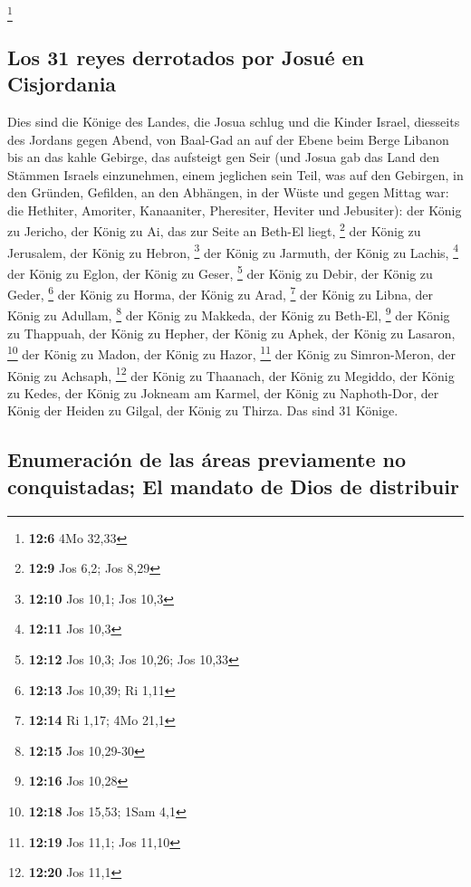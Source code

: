 \footnote{\textbf{12:6} 4Mo 32,33}

\hypertarget{los-31-reyes-derrotados-por-josuuxe9-en-cisjordania}{%
\subsection{Los 31 reyes derrotados por Josué en
Cisjordania}\label{los-31-reyes-derrotados-por-josuuxe9-en-cisjordania}}

 Dies sind die Könige des Landes, die Josua schlug und die
Kinder Israel, diesseits des Jordans gegen Abend, von Baal-Gad an auf
der Ebene beim Berge Libanon bis an das kahle Gebirge, das aufsteigt gen
Seir (und Josua gab das Land den Stämmen Israels einzunehmen, einem
jeglichen sein Teil,  was auf den Gebirgen, in den
Gründen, Gefilden, an den Abhängen, in der Wüste und gegen Mittag war:
die Hethiter, Amoriter, Kanaaniter, Pheresiter, Heviter und Jebusiter):
 der König zu Jericho, der König zu Ai, das zur Seite an
Beth-El liegt, \footnote{\textbf{12:9} Jos 6,2; Jos 8,29}
 der König zu Jerusalem, der König zu Hebron, \footnote{\textbf{12:10}
  Jos 10,1; Jos 10,3}  der König zu Jarmuth, der König zu
Lachis, \footnote{\textbf{12:11} Jos 10,3}  der König zu
Eglon, der König zu Geser, \footnote{\textbf{12:12} Jos 10,3; Jos 10,26;
  Jos 10,33}  der König zu Debir, der König zu Geder,
\footnote{\textbf{12:13} Jos 10,39; Ri 1,11}  der König
zu Horma, der König zu Arad, \footnote{\textbf{12:14} Ri 1,17; 4Mo 21,1}
 der König zu Libna, der König zu Adullam, \footnote{\textbf{12:15}
  Jos 10,29-30}  der König zu Makkeda, der König zu
Beth-El, \footnote{\textbf{12:16} Jos 10,28}  der König
zu Thappuah, der König zu Hepher,  der König zu Aphek,
der König zu Lasaron, \footnote{\textbf{12:18} Jos 15,53; 1Sam 4,1}
 der König zu Madon, der König zu Hazor, \footnote{\textbf{12:19}
  Jos 11,1; Jos 11,10}  der König zu Simron-Meron, der
König zu Achsaph, \footnote{\textbf{12:20} Jos 11,1}  der
König zu Thaanach, der König zu Megiddo,  der König zu
Kedes, der König zu Jokneam am Karmel,  der König zu
Naphoth-Dor, der König der Heiden zu Gilgal,  der König
zu Thirza. Das sind 31 Könige.

\hypertarget{enumeraciuxf3n-de-las-uxe1reas-previamente-no-conquistadas-el-mandato-de-dios-de-distribuir}{%
\subsection{Enumeración de las áreas previamente no conquistadas; El
mandato de Dios de
distribuir}\label{enumeraciuxf3n-de-las-uxe1reas-previamente-no-conquistadas-el-mandato-de-dios-de-distribuir}}


